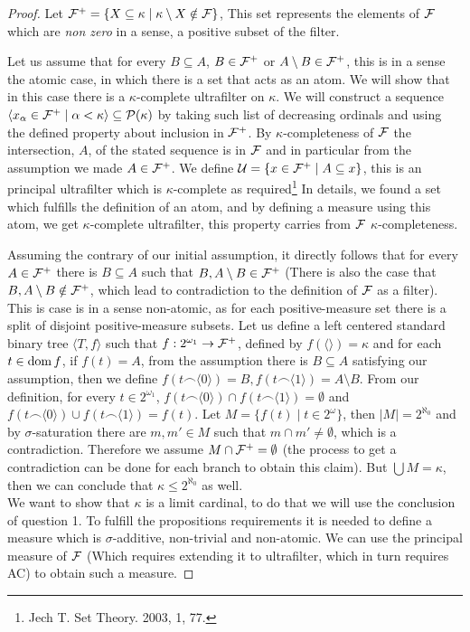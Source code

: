 \begin{proof}
	Let $\mathcal{F}^+ = \{X \subseteq \kappa \mid \kappa \setminus X \notin \mathcal{F}\}$, This set represents the elements of $\mathcal{F}$ which are \textit{non zero} in a sense, a positive subset of the filter.

	Let us assume that for every $B \subseteq A$, $B \in \mathcal{F}^+$ or $A \setminus B \in \mathcal{F}^+$, this is in a sense the atomic case, in which there is a set that acts as an atom.
	We will show that in this case there is a $\kappa$-complete ultrafilter on $\kappa$.
	We will construct a sequence $\langle x_\alpha \in \mathcal{F}^+ \mid \alpha < \kappa \rangle \subseteq \mathcal{P}(\kappa)$ by taking such list of decreasing ordinals and using the defined property about inclusion in $\mathcal{F}^+$.
	By $\kappa$-completeness of $\mathcal{F}$ the intersection, $A$, of the stated sequence is in $\mathcal{F}$ and in particular from the assumption we made $A \in \mathcal{F}^+$.
	We define $\mathcal{U} = \{ x \in \mathcal{F}^+ \mid A \subseteq x \}$, this is an principal ultrafilter which is $\kappa$-complete as required\footnote{Jech T. Set Theory. 2003, 1, 77.}
	In details, we found a set which fulfills the definition of an atom, and by defining a measure using this atom, we get $\kappa$-complete ultrafilter, this property carries from $\mathcal{F}$ $\kappa$-completeness.

	Assuming the contrary of our initial assumption, it directly follows that for every $A \in \mathcal{F}^+$ there is $B \subseteq A$ such that $B, A \setminus B \in \mathcal{F}^+$
	(There is also the case that $B, A \setminus B \notin \mathcal{F}^+$, which lead to contradiction to the definition of $\mathcal{F}$ as a filter).
	This is case is in a sense non-atomic, as for each positive-measure set there is a split of disjoint positive-measure subsets.
	Let us define a left centered standard binary tree $\langle T, f \rangle$ such that $f : 2^{\omega_1} \to \mathcal{F}^+$, defined by $f(\langle \rangle) = \kappa$ and for each $t \in \operatorname{dom} f$,
	if $f(t) = A$, from the assumption there is $B \subseteq A$ satisfying our assumption, then we define $f(t \frown \langle 0 \rangle) = B, f(t \frown \langle 1 \rangle) = A \setminus B$.
	From our definition, for every $t \in 2^{\omega_1}$, $f(t \frown \langle 0 \rangle) \cap f(t \frown \langle 1 \rangle) = \emptyset$ and $f(t \frown \langle 0 \rangle) \cup f(t \frown \langle 1 \rangle) = f(t)$.
	Let $M = \{ f(t) \mid t \in 2^{\omega} \}$, then $|M| = 2^{\aleph_0}$ and by $\sigma$-saturation there are $m, m' \in M$ such that $m \cap m' \ne \emptyset$, which is a contradiction.
	Therefore we assume $M \cap \mathcal{F}^+ = \emptyset$ (the process to get a contradiction can be done for each branch to obtain this claim).
	But $\bigcup M = \kappa$, then we can conclude that $\kappa \le 2^{\aleph_0}$ as well. \\
	We want to show that $\kappa$ is a limit cardinal, to do that we will use the conclusion of question 1.
	To fulfill the propositions requirements it is needed to define a measure which is $\sigma$-additive, non-trivial and non-atomic.
	We can use the principal measure of $\mathcal{F}$ (Which requires extending it to ultrafilter, which in turn requires AC) to obtain such a measure.
\end{proof}



